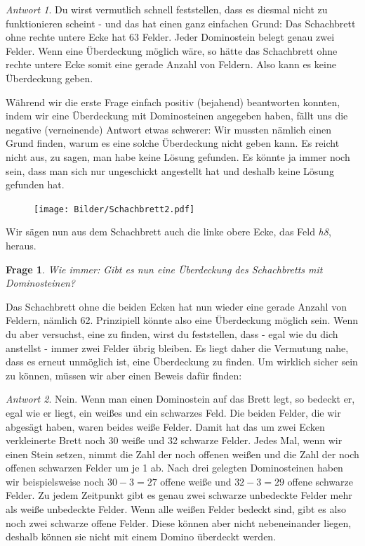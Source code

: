 \documentclass[a4paper,ngerman,12pt]{scrartcl}
\theoremstyle{definition}
\theoremstyle{plain}
\newtheorem{frage}[defn]{Frage}
\theoremstyle{remark}
\newtheorem*{antwort}{Antwort}
\begin{document}
\begin{antwort}
	Du wirst vermutlich schnell feststellen, dass es diesmal nicht zu funktionieren scheint - und das hat einen ganz einfachen Grund: Das Schachbrett ohne rechte untere Ecke hat 63 Felder. Jeder Dominostein belegt genau zwei Felder. Wenn eine Überdeckung möglich wäre, so hätte das Schachbrett ohne rechte untere Ecke somit eine gerade Anzahl von Feldern. Also kann es keine Überdeckung geben.
\end{antwort}

Während wir die erste Frage einfach positiv (bejahend) beantworten konnten, indem wir eine Überdeckung mit Dominosteinen angegeben haben, fällt uns die negative (verneinende) Antwort etwas schwerer: Wir mussten nämlich einen Grund finden, warum es eine solche Überdeckung nicht geben kann. Es reicht nicht aus, zu sagen, man habe keine Lösung gefunden. Es könnte ja immer noch sein, dass man sich nur ungeschickt angestellt hat und deshalb keine Lösung gefunden hat.

\begin{figure}\vspace{-20pt}
	\texttt{[image: Bilder/Schachbrett2.pdf]}
	\vspace{-40pt}
\end{figure}

Wir sägen nun aus dem Schachbrett auch die linke obere Ecke, das Feld \emph{h8}, heraus.

\begin{frage}
	Wie immer: Gibt es nun eine Überdeckung des Schachbretts mit Dominosteinen?
\end{frage}

Das Schachbrett ohne die beiden Ecken hat nun wieder eine gerade Anzahl von Feldern, nämlich 62. Prinzipiell könnte also eine Überdeckung möglich sein. Wenn du aber versuchst, eine zu finden, wirst du feststellen, dass - egal wie du dich anstellst - immer zwei Felder übrig bleiben. Es liegt daher die Vermutung nahe, dass es erneut unmöglich ist, eine Überdeckung zu finden. Um wirklich sicher sein zu können, müssen wir aber einen Beweis dafür finden: 

\begin{antwort}
	Nein. Wenn man einen Dominostein auf das Brett legt, so bedeckt er, egal wie er liegt, ein weißes und ein schwarzes Feld. Die beiden Felder, die wir abgesägt haben, waren beides weiße Felder. Damit hat das um zwei Ecken verkleinerte Brett noch 30 weiße und 32 schwarze Felder. Jedes Mal, wenn wir einen Stein setzen, nimmt die Zahl der noch offenen weißen und die Zahl der noch offenen schwarzen Felder um je 1 ab. Nach drei gelegten Dominosteinen haben wir beispielsweise noch $30-3=27$ offene weiße und $32-3=29$ offene schwarze Felder. Zu jedem Zeitpunkt gibt es genau zwei schwarze unbedeckte Felder mehr als weiße unbedeckte Felder. Wenn alle weißen Felder bedeckt sind, gibt es also noch zwei schwarze offene Felder. Diese können aber nicht nebeneinander liegen, deshalb können sie nicht mit einem Domino überdeckt werden.
\end{antwort}
\end{document}
